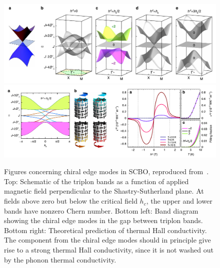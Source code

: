 \documentclass{thesis-umich}
\begin{document}
\begin{figure}
	\centering
	\caption[Chiral Edge Modes in SCBO]{Figures concerning chiral edge modes in SCBO, reproduced from~\cite{Romhanyi2015}. Top: Schematic of the triplon bands as a function of applied magnetic field perpendicular to the Shastry-Sutherland plane. At fields above zero but below the critical field $h_c$, the upper and lower bands have nonzero Chern number. Bottom left: Band diagram showing the chiral edge modes in the gap between triplon bands. Bottom right: Theoretical prediction of thermal Hall conductivity. The component from the chiral edge modes should in principle give rise to a strong thermal Hall conductivity, since it is not washed out by the phonon thermal conductivity.}
	\includegraphics[width=\columnwidth]{figures/SCBO_triplon_bands_Romhanyi.pdf}
	\includegraphics[width=\columnwidth]{figures/SCBO_edge_modes_Romhanyi.pdf}
\end{figure}
\end{document}
